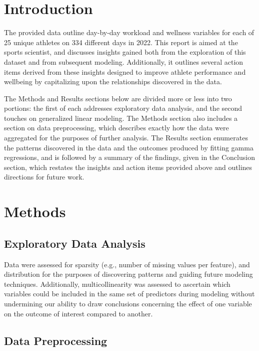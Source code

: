 \documentclass{article}
\begin{document}
	\section{Introduction}

		The provided data outline day-by-day workload and wellness
		variables for each of 25 unique athletes on 334 different
		days in 2022. This report is aimed at the sports scientist,
		and discusses insights gained both from the exploration of
		this dataset and from subsequent modeling. Additionally,
		it outlines several action items derived from these insights
		designed to improve athlete performance and wellbeing by
		capitalizing upon the relationships discovered in the data.

		The Methods and Results sections below are divided more or
		less into two portions: the first of each addresses
		exploratory data analysis, and the second touches on generalized
		linear modeling. The Methods section also includes a section
		on data preprocessing, which describes exactly how the data
		were aggregated for the purposes of further analysis.
		The Results section enumerates the patterns
		discovered in the data and the outcomes produced by fitting
		gamma regressions, and is followed by a summary of the
		findings, given in the Conclusion section, which restates
		the insights and action items provided above and outlines
		directions for future work.

	\section{Methods}

		\subsection{Exploratory Data Analysis}

			Data were assessed for sparsity (e.g., number of
			missing values per feature), and distribution for
			the purposes of discovering patterns and guiding future
			modeling techniques. Additionally, multicollinearity
			was assessed to ascertain which variables could be
			included in the same set of predictors during modeling
			without undermining our ability to draw conclusions concerning
			the effect of one variable on the outcome of interest
			compared to another.

		\subsection{Data Preprocessing}
\end{document}
